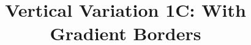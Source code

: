 \documentclass[11pt]{article}
\begin{document}
\title{Vertical Variation 1C: With Gradient Borders}
\date{}
\maketitle


\newpage

\end{document}
